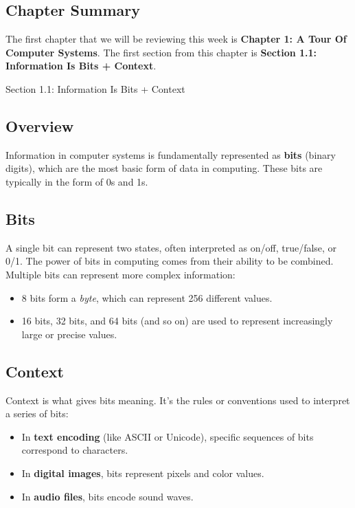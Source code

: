 \newpage

\subsection{Chapter Summary}

The first chapter that we will be reviewing this week is \textbf{Chapter 1: A Tour Of Computer Systems}. The first section from this chapter is \textbf{Section 1.1: Information Is Bits + Context}.

\begin{notes}{Section 1.1: Information Is Bits + Context}
    \subsection*{Overview}

    Information in computer systems is fundamentally represented as \textbf{bits} (binary digits), which are the most basic form of data in computing. These bits are typically in the form of 0s and 1s. \vspace*{1em}
    
    \subsection*{Bits}

    A single bit can represent two states, often interpreted as on/off, true/false, or 0/1. The power of bits in computing comes from their ability to be combined. Multiple bits can represent more complex 
    information:

    \begin{itemize}
        \item 8 bits form a \textit{byte}, which can represent 256 different values.
        \item 16 bits, 32 bits, and 64 bits (and so on) are used to represent increasingly large or precise values.
    \end{itemize}
    
    \subsection*{Context}

    Context is what gives bits meaning. It's the rules or conventions used to interpret a series of bits:

    \begin{itemize}
        \item In \textbf{text encoding} (like ASCII or Unicode), specific sequences of bits correspond to characters.
        \item In \textbf{digital images}, bits represent pixels and color values.
        \item In \textbf{audio files}, bits encode sound waves.
    \end{itemize}


\end{notes}
